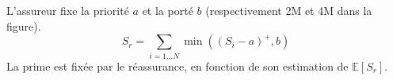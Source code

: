 \begin{f}
L'assureur fixe la priorité $a$ et la porté $b$ (respectivement 2M\EUR{} et  4M\EUR{} dans la figure).
$$
S_r= \sum_{i=1\ldots N} \min\left( \left( S_i-a\right)^+,b\right)  
$$
La prime est fixée par le réassurance, en fonction de son estimation de $\mathbb{E}[S_r]$.


\end{f}
